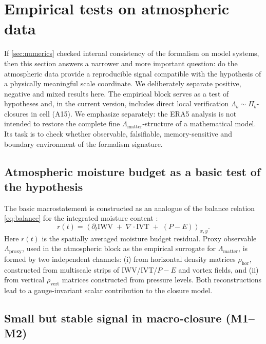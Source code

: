 \documentclass[11pt,a4paper]{article}
\theoremstyle{definition}
\theoremstyle{plain}
\theoremstyle{remark}
\begin{document}
\section{Empirical tests on atmospheric data}
\label{sec:macro}

If \cref{sec:numerics} checked internal consistency of the formalism on model systems,
then this section answers a narrower and more important question: do the atmospheric data provide a reproducible signal
compatible with the hypothesis of a physically meaningful scale coordinate.
We deliberately separate positive, negative and mixed results here.
The empirical block serves as a test of hypotheses and, in the current version, includes direct local verification \(\Lambda_b\sim\Pi_b\)-closures in cell (A15).
We emphasize separately: the ERA5 analysis is not intended to restore the complete fine $\Lambda_{\mathrm{matter}}$-structure of a mathematical model.
Its task is to check whether observable, falsifiable, memory-sensitive and boundary environment of the formalism signature.

\subsection{Atmospheric moisture budget as a basic test of the hypothesis}

The basic macrostatement is constructed as an analogue of the balance relation \eqref{eq:balance}
for the integrated moisture content \cite{PeixotoOort1992PhysicsClimate,TrenberthEtAl2007WaterBudget}:
\begin{equation}
\label{eq:macro_residual}
r(t)=\left\langle
\partial_t\mathrm{IWV}
\;+\;
\nabla\!\cdot\!\mathrm{IVT}
\;+\;
(P-E)
\right\rangle_{x,y}.
\end{equation}
Here $r(t)$ is the spatially averaged moisture budget residual.
Proxy observable $\Lambda_{\mathrm{proxy}}$, used in the atmospheric block as the empirical surrogate for $\Lambda_{\mathrm{matter}}$,
is formed by two independent channels:
(i) from horizontal density matrices $\rho_{\mathrm{hor}}$, constructed from multiscale strips of IWV/IVT/$P\!-\!E$ and vortex fields,
and (ii) from vertical $\rho_{\mathrm{vert}}$ matrices constructed from pressure levels.
Both reconstructions lead to a gauge-invariant scalar contribution to the closure model.

\subsection{Small but stable signal in macro-closure (M1--M2)}
\end{document}
